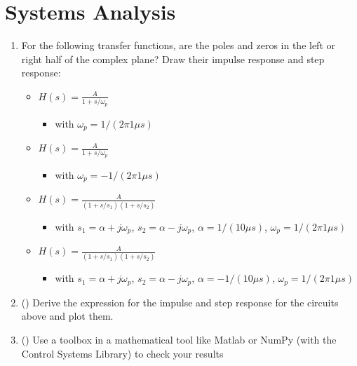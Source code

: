 \documentclass[letterpaper,10pt,english]{jupyterBook}
\begin{document}
\section{Systems Analysis}
\label{\detokenize{TestYourKnowledge/AEC_prereq_test/AEC_entry_test:systems-analysis}}\begin{enumerate}
%
\item {} 
\sphinxAtStartPar
For the following transfer functions, are the poles and zeros in the left or right half of the complex plane? Draw their impulse response and step response:
\begin{itemize}
\item {} 
\sphinxAtStartPar
\(H(s) = \frac{A}{1 + s/\omega_p}\)
\begin{itemize}
\item {} 
\sphinxAtStartPar
with \(\omega_p = 1/(2\pi 1\mu s)\)

\end{itemize}

\item {} 
\sphinxAtStartPar
\(H(s) = \frac{A}{1 + s/\omega_p}\)
\begin{itemize}
\item {} 
\sphinxAtStartPar
with \(\omega_p = -1/(2\pi 1\mu s)\)

\end{itemize}

\item {} 
\sphinxAtStartPar
\(H(s) = \frac{A}{(1 + s/s_{1})(1 + s/s_{2})}\)
\begin{itemize}
\item {} 
\sphinxAtStartPar
with \(s_1 = \alpha + j \omega_{p}\), \(s_2 = \alpha - j \omega_{p}\), \(\alpha = 1/(10 \mu s)\), \(\omega_p = 1/(2\pi 1\mu s)\)

\end{itemize}

\item {} 
\sphinxAtStartPar
\(H(s) = \frac{A}{(1 + s/s_{1})(1 + s/s_{2})}\)
\begin{itemize}
\item {} 
\sphinxAtStartPar
with \(s_1 = \alpha + j \omega_{p}\), \(s_2 = \alpha - j \omega_{p}\), \(\alpha = -1/(10 \mu s)\), \(\omega_p = 1/(2\pi 1\mu s)\)

\end{itemize}

\end{itemize}

\item {} 
\sphinxAtStartPar
() Derive the expression for the impulse and step response for the circuits above and plot them.

\item {} 
\sphinxAtStartPar
() Use a toolbox in a mathematical tool like Matlab or NumPy (with the Control Systems Library) to check your results

\end{enumerate}
\end{document}
